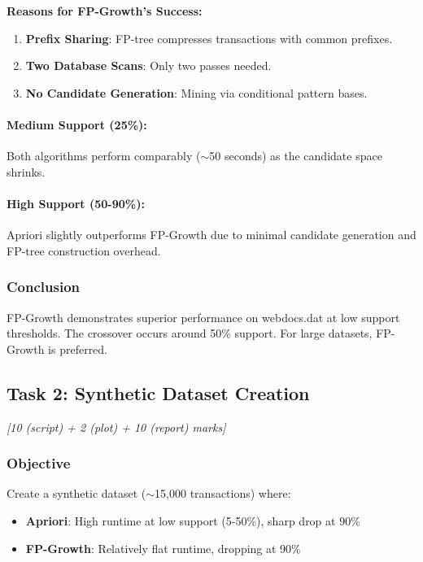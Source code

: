 \documentclass[11pt,a4paper]{article}
\begin{document}
\textbf{Reasons for FP-Growth's Success:}
\begin{enumerate}
    \item \textbf{Prefix Sharing}: FP-tree compresses transactions with common prefixes.
    \item \textbf{Two Database Scans}: Only two passes needed.
    \item \textbf{No Candidate Generation}: Mining via conditional pattern bases.
\end{enumerate}

\paragraph{Medium Support (25\%):} Both algorithms perform comparably ($\sim$50 seconds) as the candidate space shrinks.

\paragraph{High Support (50-90\%):} Apriori slightly outperforms FP-Growth due to minimal candidate generation and FP-tree construction overhead.

\subsubsection{Conclusion}

FP-Growth demonstrates superior performance on webdocs.dat at low support thresholds. The crossover occurs around 50\% support. For large datasets, FP-Growth is preferred.

\subsection{Task 2: Synthetic Dataset Creation}
\textit{[10 (script) + 2 (plot) + 10 (report) marks]}

\subsubsection{Objective}

Create a synthetic dataset ($\sim$15,000 transactions) where:
\begin{itemize}
    \item \textbf{Apriori}: High runtime at low support (5-50\%), sharp drop at 90\%
    \item \textbf{FP-Growth}: Relatively flat runtime, dropping at 90\%
\end{itemize}
\end{document}
